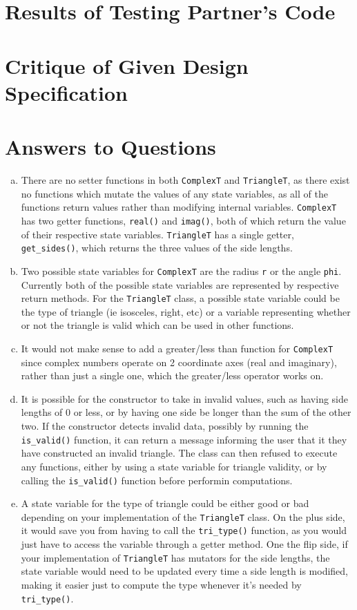 \documentclass[12pt]{article}
\begin{document}
\section{Results of Testing Partner's Code}


\section{Critique of Given Design Specification}



\section{Answers to Questions}

\begin{enumerate}[(a)]

\item There are no setter functions in both \verb|ComplexT| and \verb|TriangleT|, as there exist no functions which mutate the values of any state variables, as all of the functions return values rather than modifying internal variables. \verb|ComplexT| has two getter functions, \verb|real()| and \verb|imag()|, both of which return the value of their respective state variables. \verb|TriangleT| has a single getter, \verb|get_sides()|, which returns the three values of the side lengths. 	
\item Two possible state variables for \verb|ComplexT| are the radius \verb|r| or the angle \verb|phi|. Currently both of the possible state variables are represented by respective return methods. For the \verb|TriangleT| class, a possible state variable could be the type of triangle (ie isosceles, right, etc) or a variable representing whether or not the triangle is valid which can be used in other functions. 
\item It would not make sense to add a greater/less than function for \verb|ComplexT| since complex numbers operate on 2 coordinate axes (real and imaginary), rather than just a single one, which the greater/less operator works on. 
\item It is possible for the constructor to take in invalid values, such as having side lengths of 0 or less, or by having one side be longer than the sum of the other two. If the constructor detects invalid data, possibly by running the \verb|is_valid()| function, it can return a message informing the user that it they have constructed an invalid triangle. The class can then refused to execute any functions, either by using a state variable for triangle validity, or by calling the \verb|is_valid()| function before performin computations.
\item A state variable for the type of triangle could be either good or bad depending on your implementation of the \verb|TriangleT| class. On the plus side, it would save you from having to call the \verb|tri_type()| function, as you would just have to access the variable through a getter method. One the flip side, if your implementation of \verb|TriangleT| has mutators for the side lengths, the state variable would need to be updated every time a side length is modified, making it easier just to compute the type whenever it's needed by \verb|tri_type()|.	


\end{enumerate}
\end{document}

